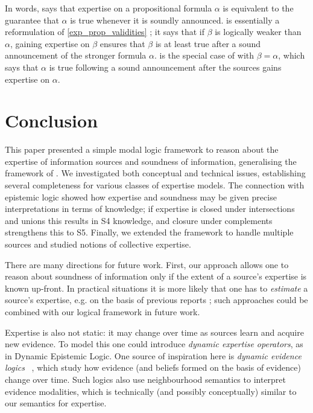 In words,  says that expertise on a propositional
formula $\alpha$ is equivalent to the guarantee that $\alpha$ is true whenever
it is soundly announced.  is essentially a
reformulation of \cref{exp_prop_validities} ; it says that
if $\beta$ is logically weaker than $\alpha$, gaining expertise on $\beta$
ensures that $\beta$ is at least true after a sound announcement of the
stronger formula $\alpha$.   is the special
case of  with $\beta = \alpha$, which says that
$\alpha$ is true following a sound announcement after the sources gains
expertise on $\alpha$.

\section{Conclusion}
\label{exp_sec_conclusion}

This paper presented a simple modal logic framework to reason about the
expertise of information sources and soundness of information, generalising the
framework of \textcite{singleton2021logic}. We investigated both conceptual and
technical issues, establishing several completeness for various classes of
expertise models. The connection with epistemic logic showed how expertise and
soundness may be given precise interpretations in terms of knowledge; if
expertise is closed under intersections and unions this results in S4
knowledge, and closure under complements strengthens this to S5. Finally, we
extended the framework to handle multiple sources and studied notions of
collective expertise.

There are many directions for future work.
%
First, our approach allows one to reason about soundness of information
only if the extent of a source's expertise is known up-front. In practical
situations it is more likely that one has to \emph{estimate} a source's
expertise, e.g. on the basis of previous reports
\cite{hunter_building_2021,dastani2004inferring}; such approaches could be
combined with our logical framework in future work.

Expertise is also not static: it may change over time as sources learn and
acquire new evidence. To model this one could introduce \emph{dynamic expertise
operators}, as in Dynamic Epistemic Logic. One
source of inspiration here is \emph{dynamic evidence logics}
~\cite{van2011dynamic,vanbenthem2014106}, which study how evidence (and
beliefs formed on the basis of evidence) change over time. Such logics also use
neighbourhood semantics to interpret evidence modalities, which is technically
(and possibly conceptually) similar to our semantics for expertise.

